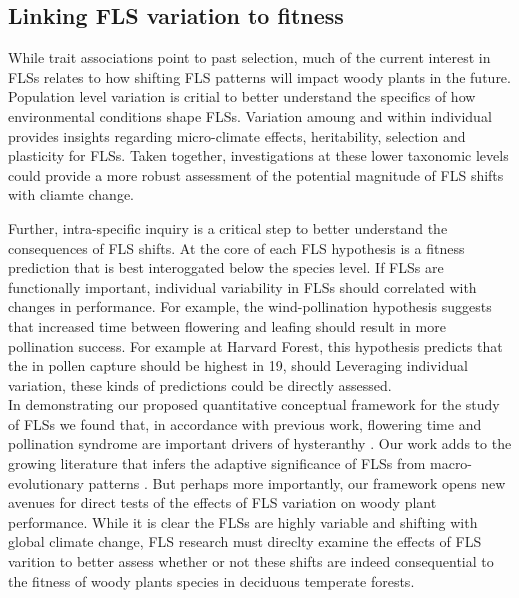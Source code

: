 \documentclass[11pt]{article}
\begin{document}
\subsection*{Linking FLS variation to fitness}
\noindnent While trait associations point to past selection, much of the current interest in FLSs relates to how shifting FLS patterns will impact woody plants in the future. Population level variation is critial to better understand the specifics of how environmental conditions shape FLSs. Variation amoung and within individual provides insights regarding  micro-climate effects, heritability, selection and plasticity for FLSs. Taken together, investigations at these lower taxonomic levels could provide a more robust assessment of the potential magnitude of FLS shifts with cliamte change.

\noindent Further, intra-specific inquiry is a critical step to better understand the consequences of FLS shifts. At the core of each FLS hypothesis is a fitness prediction that is best interoggated below the species level. If FLSs are functionally important, individual variability in FLSs should correlated with changes in performance. For example, the wind-pollination hypothesis suggests that increased time between flowering and leafing should result in more pollination success. For example at Harvard Forest, this hypothesis predicts that the in pollen capture should be highest in 19, should  Leveraging individual variation, these kinds of predictions could be directly assessed.\\ 

\noindent In demonstrating our proposed quantitative conceptual framework for the study of FLSs we found that, in accordance with previous work, flowering time and pollination syndrome are important drivers of hysteranthy \citep{Gougherty2018}. Our work adds to the growing literature that infers the adaptive significance of FLSs from macro-evolutionary patterns \citep{}. But perhaps more importantly, our framework opens new avenues for direct tests of the effects of FLS variation on woody plant performance. While it is clear the FLSs are highly variable and shifting with global climate change, FLS research must direclty examine the effects of FLS varition to better assess whether or not these shifts are indeed consequential to the fitness of woody plants species in deciduous temperate forests.\\
\end{document}
